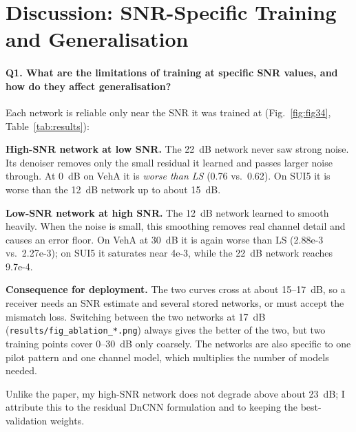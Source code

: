 \documentclass[a4paper,10pt]{article}
\newenvironment{packed_enum}{
\begin{enumerate}
  \setlength{\itemsep}{1.5pt}
  \setlength{\parskip}{0pt}
  \setlength{\parsep}{0pt}
}{\end{enumerate}}
\begin{document}
\section{Discussion: SNR-Specific Training and Generalisation}
\label{sec:discussion}
\paragraph{Q1. What are the limitations of training at specific SNR values, and how do they affect generalisation?}
Each network is reliable only near the SNR it was trained at (Fig.~\ref{fig:fig34}, Table~\ref{tab:results}):
\begin{packed_enum}
    \item \textbf{High-SNR network at low SNR.} The 22~dB network never saw strong noise. Its denoiser removes only the small residual it learned and passes larger noise through. At 0~dB on VehA it is \emph{worse than LS} (0.76 vs.\ 0.62). On SUI5 it is worse than the 12~dB network up to about 15~dB.
    \item \textbf{Low-SNR network at high SNR.} The 12~dB network learned to smooth heavily. When the noise is small, this smoothing removes real channel detail and causes an error floor. On VehA at 30~dB it is again worse than LS (2.88e-3 vs.\ 2.27e-3); on SUI5 it saturates near 4e-3, while the 22~dB network reaches 9.7e-4.
    \item \textbf{Consequence for deployment.} The two curves cross at about 15--17~dB, so a receiver needs an SNR estimate and several stored networks, or must accept the mismatch loss. Switching between the two networks at 17~dB (\texttt{results/fig\_ablation\_*.png}) always gives the better of the two, but two training points cover 0--30~dB only coarsely. The networks are also specific to one pilot pattern and one channel model, which multiplies the number of models needed.
\end{packed_enum}
Unlike the paper, my high-SNR network does not degrade above about 23~dB; I attribute this to the residual DnCNN formulation and to keeping the best-validation weights.
\end{document}
